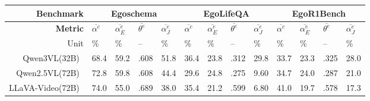 \begin{table}[htbp]
    \centering
    \fontsize{7}{10}\selectfont
    \setlength{\tabcolsep}{6pt} %
    \renewcommand{\arraystretch}{1.4} %
    \centering
    \begin{tabular}{r|p{0.3cm}<{\centering}p{0.3cm}<{\centering}p{0.3cm}<{\centering}p{0.35cm}<{\centering}|p{0.3cm}<{\centering}p{0.3cm}<{\centering}p{0.3cm}<{\centering}p{0.35cm}<{\centering}|p{0.3cm}<{\centering}p{0.3cm}<{\centering}p{0.3cm}<{\centering}p{0.35cm}<{\centering}}
        \textbf{Benchmark} &
            \multicolumn{4}{c|}{\fontsize{9}{12}\selectfont Egoschema} &
            \multicolumn{4}{c|}{\fontsize{9}{12}\selectfont EgoLifeQA} &
            \multicolumn{4}{c}{\fontsize{9}{12}\selectfont EgoR1Bench}\\ \hline \hline
        \textbf{Metric} 
        & $\overline{\alpha^c}$ & $\overline{\alpha^e_E}$ & $\overline{\theta^e}$ & $\overline{\alpha^e_J}$
        & $\overline{\alpha^c}$ & $\overline{\alpha^e_E}$ & $\overline{\theta^e}$ & $\overline{\alpha^e_J}$
        & $\overline{\alpha^c}$ & $\overline{\alpha^e_E}$ & $\overline{\theta^e}$ & $\overline{\alpha^e_J}$
        \\
        Unit 
        & \% & \% & -- & \%
        & \% & \% & -- & \%
        & \% & \% & -- & \%
        \\  \hline
        Qwen3VL(32B)~\cite{yang2025Qwen3}               & 68.4                     & 59.2                     & .608                     & 51.8\cellcolor{second!60}    & 36.4\cellcolor{third!60}  & 23.8                     & .312                     &  29.8\cellcolor{second!60}& 33.7                     & 23.3                     & .325                     & 28.0\cellcolor{second!60}\\
        Qwen2.5VL(72B)~\cite{qwen2025Qwen25}            & 72.8                     & 59.8\cellcolor{third!60} & .608                     & 44.4\cellcolor{third!60}     & 29.6                      & 24.8                     & .275                     &  9.60                     & 34.7                     & 24.0                     & .287                     & 21.0                     \\
        LLaVA-Video(72B)~\cite{zhang2025LLaVAVideo}     & 74.0                     & 55.0                     & .689\cellcolor{third!60} & 38.0                         & 35.4                      & 21.2                     & .599\cellcolor{second!60}&  6.80                     & 41.0\cellcolor{third!60} & 19.7                     & .578\cellcolor{first!60} & 17.3                     \\

\end{tabular}
\end{table}
